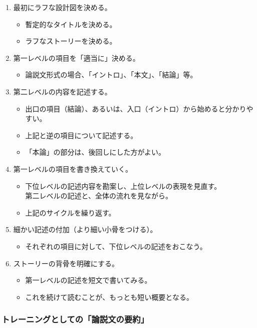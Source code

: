 \documentclass[12pt,a4paper]{jsarticle}
\begin{document}
\begin{enumerate}
\item
最初にラフな設計図を決める。
	\begin{itemize}
	\item
	暫定的なタイトルを決める。
	\item
	ラフなストーリーを決める。
	\end{itemize}
\item
第一レベルの項目を「適当に」決める。
	\begin{itemize}
	\item
	論説文形式の場合、「イントロ」、「本文」、「結論」等。
	\end{itemize}
\item
第二レベルの内容を記述する。
	\begin{itemize}
	\item
	出口の項目（結論）、あるいは、入口（イントロ）から始めると分かりやすい。
	\item
	上記と逆の項目について記述する。
	\item
	「本論」の部分は、後回しにした方がよい。
	\end{itemize}
\item
第一レベルの項目を書き換えていく。
	\begin{itemize}
	\item
	下位レベルの記述内容を勘案し、上位レベルの表現を見直す。\\
	第二レベルの記述と、全体の流れを見ながら。
	\item
	上記のサイクルを繰り返す。
	\end{itemize}
\item
細かい記述の付加（より細い小骨をつける）。
	\begin{itemize}
	\item
	それぞれの項目に対して、下位レベルの記述をおこなう。
	\end{itemize}
\item
ストーリーの背骨を明確にする。
	\begin{itemize}
	\item
	第一レベルの記述を短文で書いてみる。
	\item
	これを続けて読むことが、もっとも短い概要となる。
	\end{itemize}
\end{enumerate}

\subsubsection{トレーニングとしての「論説文の要約」}
\end{document}
